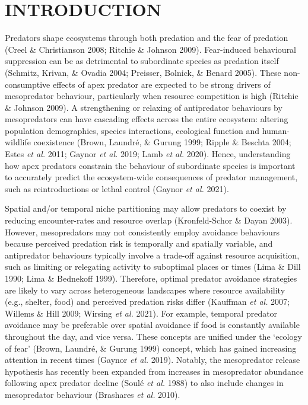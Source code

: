 \documentclass[]{elsarticle} %
\begin{document}
\newpage

\hypertarget{introduction}{%
\section{INTRODUCTION}\label{introduction}}

Predators shape ecosystems through both predation and the fear of predation (Creel \& Christianson 2008; Ritchie \& Johnson 2009). Fear-induced behavioural suppression can be as detrimental to subordinate species as predation itself (Schmitz, Krivan, \& Ovadia 2004; Preisser, Bolnick, \& Benard 2005). These non-consumptive effects of apex predator are expected to be strong drivers of mesopredator behaviour, particularly when resource competition is high (Ritchie \& Johnson 2009). A strengthening or relaxing of antipredator behaviours by mesopredators can have cascading effects across the entire ecosystem: altering population demographics, species interactions, ecological function and human-wildlife coexistence (Brown, Laundré, \& Gurung 1999; Ripple \& Beschta 2004; Estes \emph{et al.} 2011; Gaynor \emph{et al.} 2019; Lamb \emph{et al.} 2020). Hence, understanding how apex predators constrain the behaviour of subordinate species is important to accurately predict the ecosystem-wide consequences of predator management, such as reintroductions or lethal control (Gaynor \emph{et al.} 2021).

Spatial and/or temporal niche partitioning may allow predators to coexist by reducing encounter-rates and resource overlap (Kronfeld-Schor \& Dayan 2003). However, mesopredators may not consistently employ avoidance behaviours because perceived predation risk is temporally and spatially variable, and antipredator behaviours typically involve a trade-off against resource acquisition, such as limiting or relegating activity to suboptimal places or times (Lima \& Dill 1990; Lima \& Bednekoff 1999). Therefore, optimal predator avoidance strategies are likely to vary across heterogeneous landscapes where resource availability (e.g., shelter, food) and perceived predation risks differ (Kauffman \emph{et al.} 2007; Willems \& Hill 2009; Wirsing \emph{et al.} 2021). For example, temporal predator avoidance may be preferable over spatial avoidance if food is constantly available throughout the day, and vice versa. These concepts are unified under the `ecology of fear' (Brown, Laundré, \& Gurung 1999) concept, which has gained increasing attention in recent times (Gaynor \emph{et al.} 2019). Notably, the mesopredator release hypothesis has recently been expanded from increases in mesopredator abundance following apex predator decline (Soulé \emph{et al.} 1988) to also include changes in mesopredator behaviour (Brashares \emph{et al.} 2010).
\end{document}
